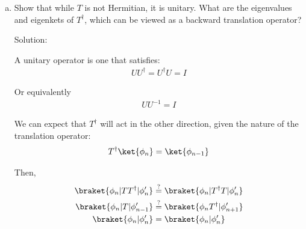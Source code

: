 \begin{homeworkProblem}
\begin{enumerate}[(a)]
\begin{callout}{Solution:}
                To continue and find the allowed $k$, it's good to remember that the normalization condition $\braket{k|k'}=$ should be something finite, which is a constraint. Let $n'$ now represent a dummy index:
                \begin{align*}
                    S &= \sum_n \sum_n' e^{-i\phi_n k} e^{i\phi_n' k} \braket{\phi_n|\phi_n'} \\
                      &= \sum_n e^{-i(\phi_n-\phi_n') k} \\
                      &= \sum_n e^{-2\pi i(n-n') k / N} \\
                \end{align*}

                So values ought to be integers, but it's also obvious that there's a wraparound, given the circular nature,
                \begin{align*}
                    e^{-2i\pi n (k+N) / N} = e^{-2i\pi nk / N} e^{-2i\pi n} = e^{-2 i \pi n k}
                \end{align*}

                So,
                $$p_k = \text{exp}\left( \frac{i2\pi k}{N} \right); \qquad k=0,1,2,\dots,N-1$$
            \end{callout}

        \item Show that while $T$ is not Hermitian, it is unitary. What are the eigenvalues and eigenkets of $T^\dagger$, which can be viewed as a backward translation operator?

            \begin{callout}{Solution:}

                A unitary operator is one that satisfies:
                \begin{align*}
                    UU^\dagger = U^\dagger U = I
                \end{align*}

                Or equivalently
                \begin{align*}
                    UU^{-1} = I
                \end{align*}

                We can expect that $T^\dagger$ will act in the other direction, given the nature of the translation operator:
                $$T^\dagger\ket{\phi_n} = \ket{\phi_{n-1}}$$

                Then,
                \begin{align*}
                    \braket{\phi_n|TT^\dagger|\phi_n'} &\stackrel{?}{=} \braket{\phi_n|T^\dagger T|\phi_n'} \\
                    \braket{\phi_n|T|\phi_{n-1}'} &\stackrel{?}{=} \braket{\phi_nT^\dagger|\phi_{n+1}'} \\
                    \braket{\phi_n|\phi_{n}'} &= \braket{\phi_n|\phi_{n}'}
                \end{align*}


\end{callout}
\end{enumerate}
\end{homeworkProblem}
